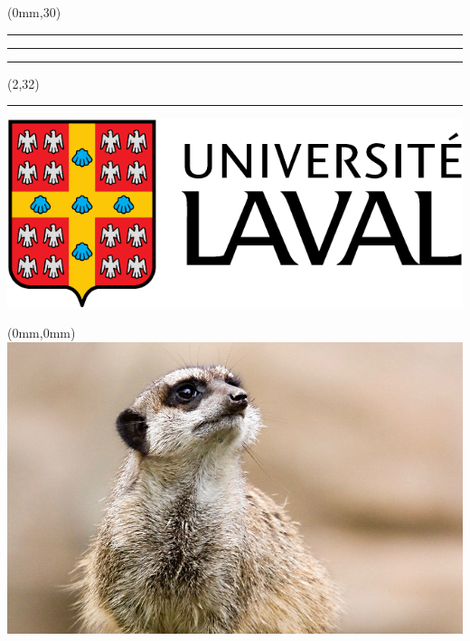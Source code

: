 \begingroup

\textblockorigin{0mm}{0mm}
\setlength{\parindent}{0mm}
\setlength{\banderougewidth}{2\TPHorizModule}
\setlength{\bandeorwidth}{\TPHorizModule}
\setlength{\imageheight}{30\TPVertModule}
\setlength{\gapwidth}{1pt}
\addtolength{\bandeorwidth}{-\gapwidth}
\addtolength{\imageheight}{-\gapwidth}

\begin{frame}[plain]
  \begin{textblock*}{125mm}(0mm,30\TPVertModule)
    \textcolor{rouge}{\rule{\banderougewidth}{\TPVertModule}}%
    \rule{\gapwidth}{0pt}%
    \textcolor{or}{\rule{\bandeorwidth}{\TPVertModule}}        %
  \end{textblock*}

  \begin{textblock*}{\TPHorizModule}(2\TPHorizModule,32\TPVertModule)
    \rule{\gapwidth}{0pt}%
    \includegraphics[height=2.5\TPVertModule,keepaspectratio=true]{ul_p}
  \end{textblock*}

  \begin{textblock*}{125mm}(0mm,0mm)
    \includegraphics[height=\imageheight,keepaspectratio=true]{Suricata-diapos.jpg}
  \end{textblock*}


\end{frame}
